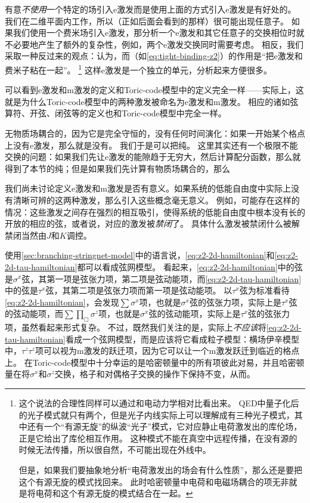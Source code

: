 有意\emph{不使用}一个特定的场引入e激发而是使用上面的方式引入e激发是有好处的。
我们在二维平面内工作，所以（正如后面会看到的那样）很可能出现任意子。
如果我们使用一个费米场引入e激发，那分析一个e激发和其它任意子的交换相位时就不必要地产生了额外的复杂性，例如，两个e激发交换同时需要考虑。
相反，我们采取一种反过来的观点：认为，而（如\eqref{eq:tight-binding-z2}）的作用是“把e激发和费米子粘在一起”。%
\footnote{
    这个说法的合理性同样可以通过和电动力学相对比看出来。
    QED中量子化后的光子模式就只有两个，但是光子内线实际上可以理解成有三种光子模式，其中还有一个“有源无旋”的纵波“光子”模式，它对应静止电荷激发出的库伦场，正是它给出了库伦相互作用。
    这种模式不能在真空中远程传播，在没有源的时候无法传播，所以很自然，不可能出现在外线中。

    但是，如果我们要抽象地分析“电荷激发出的场会有什么性质”，那么还是要把这个有源无旋的模式找回来。
    此时哈密顿量中电荷和电磁场耦合的项无非就是将电荷和这个有源无旋的模式结合在一起。
}%
这样e激发是一个独立的单元，分析起来方便很多。

可以看到e激发和m激发的定义和Toric-code模型中的定义完全一样——实际上，这就是为什么Toric-code模型中的两种激发被命名为e激发和m激发。
相应的诸如弦算符、开弦、闭弦等的定义也和Toric-code模型中完全一样。

无物质场耦合的，因为它是完全守恒的，没有任何时间演化：如果一开始某个格点上没有e激发，那么就是没有。
我们于是可以把纯。
这里其实还有一个极限不能交换的问题：如果我们先让e激发的能隙趋于无穷大，然后计算配分函数，那么就得到了本节的纯；但是如果我们先计算有物质场耦合的，那么 %

我们尚未讨论定义e激发和m激发是否有意义。如果系统的低能自由度中实际上没有清晰可辨的这两种激发，那么引入这些概念毫无意义。
例如，可能存在这样的情况：这些激发之间存在强烈的相互吸引，使得系统的低能自由度中根本没有长的开放的相应的弦，或者说，对应的激发被\emph{禁闭}了。
具体什么激发被禁闭什么被解禁闭当然由$J$和$K$调控。

使用\autoref{sec:branching-stringnet-model}中的语言说，\eqref{eq:z2-2d-hamiltonian}和\eqref{eq:z2-2d-tau-hamiltonian}都可以看成弦网模型。
看起来，\eqref{eq:z2-2d-hamiltonian}中的弦是$\sigma^x$弦，其第一项是弦张力项，第二项是弦动能项，而\eqref{eq:z2-2d-tau-hamiltonian}中的弦是$\tau^x$弦，其第二项是弦张力项而第一项是弦动能项。
以$\tau^x$弦为标准看待\eqref{eq:z2-2d-hamiltonian}，会发现$\sum \sigma^x$项，也就是$\sigma^x$弦的弦张力项，实际上是$\tau^x$弦的弦动能项，而$\sum \prod_\Box \sigma^z$项，也就是$\sigma^x$弦的弦动能项，实际上是$\tau^x$弦的弦张力项，虽然看起来形式复杂。
不过，既然我们关注的是，实际上\emph{不应该}将\eqref{eq:z2-2d-tau-hamiltonian}看成一个弦网模型，而是应该将它看成粒子模型：横场伊辛模型中，$\tau^z \tau^z$项可以视为m激发的跃迁项，因为它可以让一个m激发跃迁到临近的格点上。
在Toric-code模型中十分幸运的是哈密顿量中的所有项彼此对易，并且哈密顿量在将$\sigma^x$和$\sigma^z$交换，格子和对偶格子交换的操作下保持不变，从而。%

